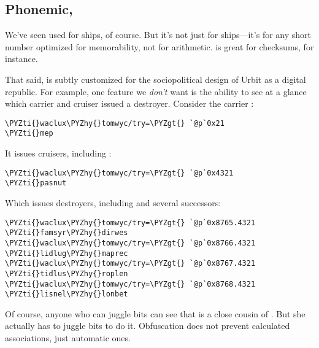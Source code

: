 \subsection{Phonemic, }

We've seen  used for ships, of course.  But it's not just for
ships---it's for any short number optimized for memorability, not
for arithmetic.   is great for checksums, for instance.

That said,  is subtly customized for the sociopolitical
design of Urbit as a digital republic.  For example, one feature
we \emph{don't} want is the ability to see at a glance which carrier
and cruiser issued a destroyer.  Consider the carrier :

\begin{framed_shaded}
\begin{Verbatim}[fontsize=\relsize{-2.5},fontseries=b,commandchars=\\\{\}]
\PYZti{}waclux\PYZhy{}tomwyc/try=\PYZgt{} `@p`0x21
\PYZti{}mep
\end{Verbatim}
\end{framed_shaded}
It issues  cruisers, including :

\begin{framed_shaded}
\begin{Verbatim}[fontsize=\relsize{-2.5},fontseries=b,commandchars=\\\{\}]
\PYZti{}waclux\PYZhy{}tomwyc/try=\PYZgt{} `@p`0x4321
\PYZti{}pasnut
\end{Verbatim}
\end{framed_shaded}
Which issues  destroyers, including  and
several successors:

\begin{framed_shaded}
\begin{Verbatim}[fontsize=\relsize{-2.5},fontseries=b,commandchars=\\\{\}]
\PYZti{}waclux\PYZhy{}tomwyc/try=\PYZgt{} `@p`0x8765.4321
\PYZti{}famsyr\PYZhy{}dirwes
\PYZti{}waclux\PYZhy{}tomwyc/try=\PYZgt{} `@p`0x8766.4321
\PYZti{}lidlug\PYZhy{}maprec
\PYZti{}waclux\PYZhy{}tomwyc/try=\PYZgt{} `@p`0x8767.4321
\PYZti{}tidlus\PYZhy{}roplen
\PYZti{}waclux\PYZhy{}tomwyc/try=\PYZgt{} `@p`0x8768.4321
\PYZti{}lisnel\PYZhy{}lonbet
\end{Verbatim}
\end{framed_shaded}
Of course, anyone who can juggle bits can see that
 is a close cousin of .  But she
actually has to juggle bits to do it.  Obfuscation does not
prevent calculated associations, just automatic ones.

